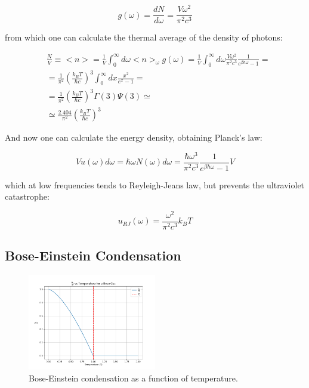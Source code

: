 \documentclass{article}
\begin{document}
\begin{equation}
    g(\omega)=\frac{d N}{d\omega}=\frac{V\omega^2}{\pi^2c^3}
\end{equation}

from which one can calculate the thermal average of the density of photons:

\begin{equation}
    \begin{aligned}
         & \frac{N}{V}\equiv<n>=\frac{1}{V}\int_0^\infty d\omega <n>_\omega g(\omega)=\frac{1}{V}\int_0^\infty d\omega \frac{V\omega^2}{\pi^2c^3}\frac{1}{e^{\beta\hbar\omega}-1}= \\
         & =\frac{1}{\pi^2}\left(\frac{k_B T}{\hbar c}\right)^3\int_0^\infty dx \frac{x^2}{e^x-1}=                                                                                 \\
         & = \frac{1}{\pi^2}\left(\frac{k_B T}{\hbar c}\right)^3 \Gamma(3)\Psi(3)\simeq                                                                                            \\
         & \simeq \frac{2.404}{\pi^2}\left(\frac{k_B T}{\hbar c}\right)^3
    \end{aligned}
\end{equation}

And now one can calculate the energy density, obtaining Planck's law:

\begin{equation}
    V u(\omega)d\omega=\hbar \omega N(\omega)d\omega=\frac{\hbar \omega^3}{\pi^2c^3}\frac{1}{e^{\beta\hbar\omega}-1}V
\end{equation}

which at low frequencies tends to Reyleigh-Jeans law, but prevents the ultraviolet catastrophe:

\begin{equation}
    u_{RJ}(\omega)=\frac{ \omega^2}{\pi^2c^3}k_BT
\end{equation}


\subsection{Bose-Einstein Condensation}

\begin{figure}[h]
    \centering
    \includegraphics[width=0.5\textwidth]{images/bose-einstein-condensation.png}
    \caption{Bose-Einstein condensation as a function of temperature.}
    \label{fig:bose-einstein-condensation}
\end{figure}
\end{document}
